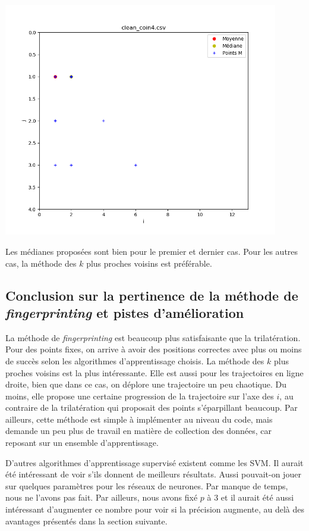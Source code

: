 \documentclass[french, a4paper, 12pt, parskip]{scrartcl}
\begin{document}
\begin{center}
  \includegraphics[width=0.9\textwidth]{finger3-f4.png}
\end{center}
Les médianes proposées sont bien pour le premier et dernier cas. Pour les
autres cas, la méthode des $k$ plus proches voisins est préférable.

\subsection{Conclusion sur la pertinence de la méthode de \textit{fingerprinting} et pistes d'amélioration}

La méthode de \textit{fingerprinting} est beaucoup plus satisfaisante que la
trilatération. Pour des points fixes, on arrive à avoir des positions correctes
avec plus ou moins de succès selon les algorithmes d'apprentissage choisis. La
méthode des $k$ plus proches voisins est la plus intéressante. Elle est aussi
pour les trajectoires en ligne droite, bien que dans ce cas, on déplore une
trajectoire un peu chaotique. Du moins, elle propose une certaine progression
de la trajectoire sur l'axe des $i$, au contraire de la trilatération qui
proposait des points s'éparpillant beaucoup. Par ailleurs, cette méthode est
simple à implémenter au niveau du code, mais demande un peu plus de travail en
matière de collection des données, car reposant sur un ensemble d'apprentissage.

D'autres algorithmes d'apprentissage supervisé existent comme les SVM. Il
aurait été intéressant de voir s'ils donnent de meilleurs résultats. Aussi
pouvait-on jouer sur quelques paramètres pour les réseaux de neurones. Par
manque de temps, nous ne l'avons pas fait. Par ailleurs, nous avons fixé $p$ à
3 et il aurait été aussi intéressant d'augmenter ce nombre pour voir si la
précision augmente, au delà des avantages présentés dans la section suivante.
\end{document}
